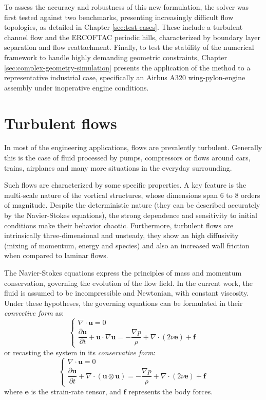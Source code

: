 \documentclass[12pt, a4paper, twoside, openright]{book}
\begin{document}
To assess the accuracy and robustness of this new formulation, the solver was first tested against two benchmarks, presenting increasingly difficult flow topologies, as detailed in Chapter \ref{sec:test-cases}. These include a turbulent channel flow and the ERCOFTAC periodic hills, characterized by boundary layer separation and flow reattachment. Finally, to test the stability of the numerical framework to handle highly demanding geometric constraints, Chapter \ref{sec:complex-geometry-simulation} presents the application of the method to a representative industrial case, specifically an Airbus A320 wing-pylon-engine assembly under inoperative engine conditions.

\chapter{Turbulent flows}
\label{sec:turbulent-flows}

In most of the engineering applications, flows are prevalently turbulent. Generally this is the case of fluid processed by pumps, compressors or flows around cars, trains, airplanes and many more situations in the everyday surrounding.

Such flows are characterized by some specific properties. A key feature is the multi-scale nature of the vortical structures, whose dimensions span 6 to 8 orders of magnitude. Despite the deterministic nature (they can be described accurately by the Navier-Stokes equations), the strong dependence and sensitivity to initial conditions make their behavior chaotic. Furthermore, turbulent flows are intrinsically three-dimensional and unsteady, they show an high diffusivity (mixing of momentum, energy and species) and also an increased wall friction when compared to laminar flows.

The Navier-Stokes equations express the principles of mass and momentum conservation, governing the evolution of the flow field. In the current work, the fluid is assumed to be incompressible and Newtonian, with constant viscosity. Under these hypotheses, the governing equations can be formulated in their \textit{convective form} as:
\begin{equation}
\label{eq:NS-conv}
\begin{cases}
    \nabla \cdot \bm{u} = 0 \\[1.5ex]
    \dfrac{\partial \bm{u}}{\partial t} + \bm{u} \cdot \nabla \bm{u} = -\dfrac{\nabla p}{\rho} + \nabla \cdot (2\nu \bm{e}) + \bm{f}
\end{cases}
\end{equation}
or recasting the system in its \textit{conservative form}:
\begin{equation}
\label{eq:NS-cons}
\begin{cases}
    \nabla \cdot \bm{u} = 0 \\[1.5ex]
    \dfrac{\partial \bm{u}}{\partial t} + \nabla \cdot (\bm{u} \otimes \bm{u}) = -\dfrac{\nabla p}{\rho} + \nabla \cdot (2\nu \bm{e}) + \bm{f}
\end{cases}
\end{equation}
where $\bm{e}$ is the strain-rate tensor, and $\bm{f}$ represents the body forces.
\end{document}
